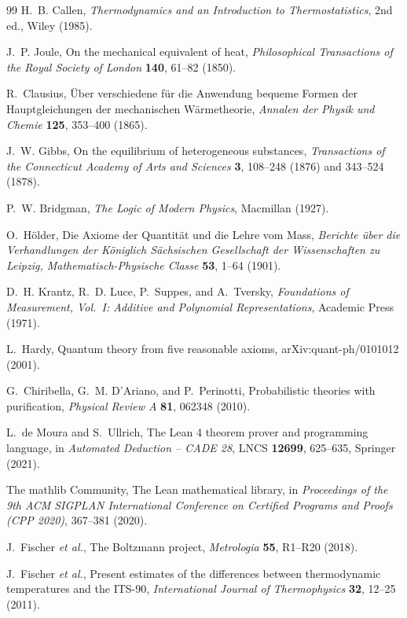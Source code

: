 \begin{thebibliography}{99}
H.~B. Callen,
\emph{Thermodynamics and an Introduction to Thermostatistics}, 2nd ed.,
Wiley (1985).

J.~P. Joule,
On the mechanical equivalent of heat,
\emph{Philosophical Transactions of the Royal Society of London} \textbf{140}, 61--82 (1850).

R.~Clausius,
Über verschiedene für die Anwendung bequeme Formen der Hauptgleichungen der mechanischen Wärmetheorie,
\emph{Annalen der Physik und Chemie} \textbf{125}, 353--400 (1865).

J.~W. Gibbs,
On the equilibrium of heterogeneous substances,
\emph{Transactions of the Connecticut Academy of Arts and Sciences} \textbf{3}, 108--248 (1876) and 343--524 (1878).

P.~W. Bridgman,
\emph{The Logic of Modern Physics},
Macmillan (1927).

O.~Hölder,
Die Axiome der Quantität und die Lehre vom Mass,
\emph{Berichte über die Verhandlungen der Königlich Sächsischen Gesellschaft der Wissenschaften zu Leipzig, Mathematisch-Physische Classe} \textbf{53}, 1--64 (1901).

D.~H. Krantz, R.~D. Luce, P.~Suppes, and A.~Tversky,
\emph{Foundations of Measurement, Vol.~I: Additive and Polynomial Representations},
Academic Press (1971).

L.~Hardy,
Quantum theory from five reasonable axioms,
arXiv:quant-ph/0101012 (2001).

G.~Chiribella, G.~M. D'Ariano, and P.~Perinotti,
Probabilistic theories with purification,
\emph{Physical Review A} \textbf{81}, 062348 (2010).

L.~de Moura and S.~Ullrich,
The Lean 4 theorem prover and programming language,
in \emph{Automated Deduction -- CADE 28}, LNCS \textbf{12699}, 625--635, Springer (2021).

The mathlib Community,
The Lean mathematical library,
in \emph{Proceedings of the 9th ACM SIGPLAN International Conference on Certified Programs and Proofs (CPP 2020)}, 367--381 (2020).

J.~Fischer \emph{et al.},
The Boltzmann project,
\emph{Metrologia} \textbf{55}, R1--R20 (2018).

J.~Fischer \emph{et al.},
Present estimates of the differences between thermodynamic temperatures and the ITS-90,
\emph{International Journal of Thermophysics} \textbf{32}, 12--25 (2011).


\end{thebibliography}

